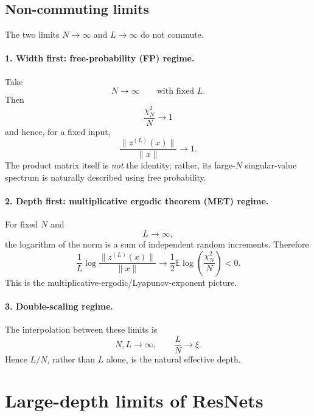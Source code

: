 

\subsection{Non-commuting limits}

The two limits \(N\to\infty\) and \(L\to\infty\) do not commute.

\paragraph{1. Width first: free-probability (FP) regime.}
Take
\[
N\rightarrow\infty
\qquad\text{with fixed }L.
\]
Then
\[
\frac{\chi_N^2}{N}
\rightarrow 1
\]
and hence, for a fixed input,
\begin{equation}
    \frac{\|z^{(L)}(x)\|}{\|x\|}
    \rightarrow 1.
\end{equation}
The product matrix itself is \emph{not} the identity; rather,
its large-\(N\) singular-value spectrum is naturally described
using free probability.

\paragraph{2. Depth first: multiplicative ergodic theorem (MET) regime.}
For fixed \(N\) and
\[
L\rightarrow\infty,
\]
the logarithm of the norm is a sum of independent random
increments.  Therefore
\begin{equation}
    \frac{1}{L}
    \log
    \frac{\|z^{(L)}(x)\|}{\|x\|}
    \rightarrow
    \frac{1}{2}
    \mathbb{E}
    \log\left(
        \frac{\chi_N^2}{N}
    \right)
    <0.
\end{equation}
This is the multiplicative-ergodic/Lyapunov-exponent picture.

\paragraph{3. Double-scaling regime.}
The interpolation between these limits is
\begin{equation}
    N,L\rightarrow\infty,
    \qquad
    \frac{L}{N}\rightarrow\xi.
\end{equation}
Hence \(L/N\), rather than \(L\) alone, is the natural effective
depth.


\section{Large-depth limits of ResNets}

